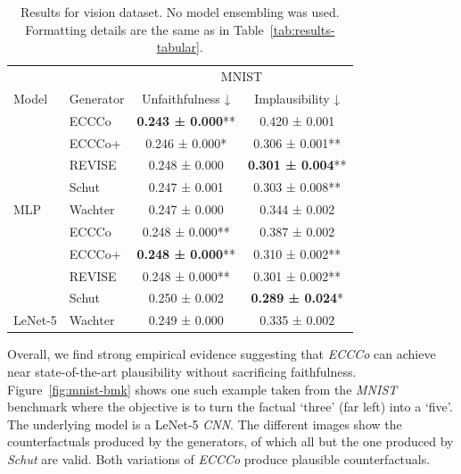 \documentclass[letterpaper]{article} %
\begin{document}
\begin{table}
  \centering
  \fontsize{9}{11}\selectfont
  \begin{tabular}[t]{llcc}
  \toprule
  \multicolumn{2}{c}{ } & \multicolumn{2}{c}{MNIST} \\
  \cmidrule(l{3pt}r{3pt}){3-4}
  Model & Generator & Unfaithfulness ↓ & Implausibility ↓\\
  \midrule
   & ECCCo & \textbf{0.243 ± 0.000}** & 0.420 ± 0.001\hphantom{*}\hphantom{*}\\
  
   & ECCCo+ & 0.246 ± 0.000*\hphantom{*} & 0.306 ± 0.001**\\
  
   & REVISE & 0.248 ± 0.000\hphantom{*}\hphantom{*} & \textbf{0.301 ± 0.004}**\\
  
   & Schut & 0.247 ± 0.001\hphantom{*}\hphantom{*} & 0.303 ± 0.008**\\
  
  \multirow{-5}{*}{\raggedright\arraybackslash MLP} & Wachter & 0.247 ± 0.000\hphantom{*}\hphantom{*} & 0.344 ± 0.002\hphantom{*}\hphantom{*}\\
  \cmidrule{1-4}
   & ECCCo & 0.248 ± 0.000** & 0.387 ± 0.002\hphantom{*}\hphantom{*}\\
  
   & ECCCo+ & \textbf{0.248 ± 0.000}** & 0.310 ± 0.002**\\
  
   & REVISE & 0.248 ± 0.000** & 0.301 ± 0.002**\\
  
   & Schut & 0.250 ± 0.002\hphantom{*}\hphantom{*} & \textbf{0.289 ± 0.024}*\hphantom{*}\\
  
  \multirow{-5}{*}{\raggedright\arraybackslash LeNet-5} & Wachter & 0.249 ± 0.000\hphantom{*}\hphantom{*} & 0.335 ± 0.002\hphantom{*}\hphantom{*}\\
  \bottomrule
  \end{tabular}
\caption{Results for vision dataset. No model ensembling was used. Formatting details are the same as in Table~\ref{tab:results-tabular}. \label{tab:results-vision}}
\end{table}

Overall, we find strong empirical evidence suggesting that \textit{ECCCo} can achieve near state-of-the-art plausibility without sacrificing faithfulness. Figure~\ref{fig:mnist-bmk} shows one such example taken from the \textit{MNIST} benchmark where the objective is to turn the factual `three' (far left) into a `five'. The underlying model is a LeNet-5 \textit{CNN}. The different images show the counterfactuals produced by the generators, of which all but the one produced by \textit{Schut} are valid. Both variations of \textit{ECCCo} produce plausible counterfactuals.
\end{document}

